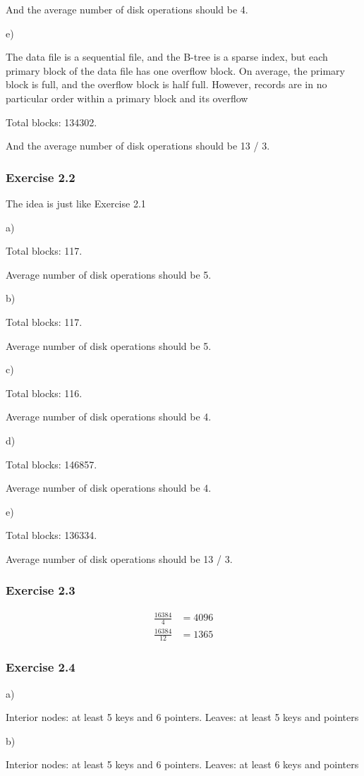 \documentclass[../../main.tex]{subfiles}
\begin{document}
And the average number of disk operations should be 4.

e)

The data file is a sequential file, and the B-tree is a sparse index, but
each primary block of the data file has one overflow block. On average,
the primary block is full, and the overflow block is half full. However,
records are in no particular order within a primary block and its overflow

Total blocks: 134302.

And the average number of disk operations should be 13 / 3.

\subsubsection*{Exercise 2.2}

The idea is just like Exercise 2.1

a)

Total blocks: 117.

Average number of disk operations should be 5.

b)

Total blocks: 117.

Average number of disk operations should be 5.

c)

Total blocks: 116.

Average number of disk operations should be 4.

d)

Total blocks: 146857.

Average number of disk operations should be 4.

e)

Total blocks: 136334.

Average number of disk operations should be 13 / 3.

\subsubsection*{Exercise 2.3}

\begin{align*}
  \frac{16384}{4} &= 4096 \\
  \frac{16384}{12} &= 1365
\end{align*}

\subsubsection*{Exercise 2.4}

a)

Interior nodes: at least 5 keys and 6 pointers. Leaves: at least 5 keys and pointers

b)

Interior nodes: at least 5 keys and 6 pointers. Leaves: at least 6 keys and pointers
\end{document}
